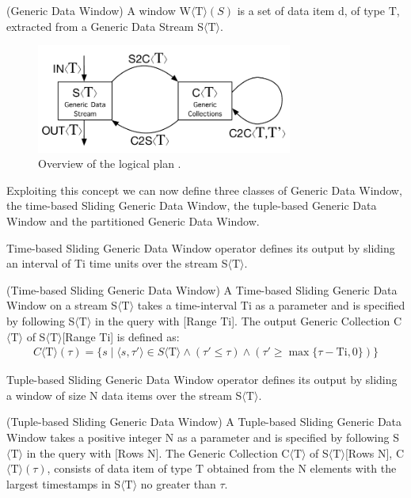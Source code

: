 {\begin{Definition}
(Generic Data Window) A window W$\langle\mathrm{T}\rangle(S)$ is a set of data item d, of type $\mathrm{T}$, extracted from a Generic Data Stream S$\langle\mathrm{T}\rangle$. 
\end{Definition}

\begin{figure}[t]
    \centering
    \includegraphics[width=0.75\textwidth]{img/computational-model-operators}
    \caption{Overview of the logical plan \textnormal{\protect\river{}}.}
    \label{fig:cm-op}
\end{figure}

Exploiting this concept we can now define three classes of Generic Data Window, the time-based Sliding Generic Data Window, the tuple-based Generic Data Window and the partitioned Generic Data Window.

Time-based Sliding Generic Data Window operator defines its output by sliding an interval of Ti time units over the stream S$\langle\mathrm{T}\rangle$.

\begin{Definition}
(Time-based Sliding Generic Data Window) A Time-based Sliding Generic Data Window on a stream S$\langle\mathrm{T}\rangle$ takes a time-interval $\mathrm{Ti}$ as a parameter and is specified by following S$\langle\mathrm{T}\rangle$ in the query with [Range $\mathrm{Ti}$].
The output Generic Collection C$\langle\mathrm{T}\rangle$ of S$\langle\mathrm{T}\rangle$[Range $\mathrm{Ti}$] is defined as:
\noindent\begin{align*}
C\langle\mathrm{T}\rangle(\tau)=\{s \mid \langle s,\tau' \rangle \in S\langle\mathrm{T}\rangle \wedge (\tau' \leq \tau) \wedge (\tau' \geq \max\{\tau - \mathrm{Ti},0\})\}
\end{align*}  
\end{Definition}

Tuple-based Sliding Generic Data Window operator defines its output by sliding a window of size N data items over the stream S$\langle\mathrm{T}\rangle$.
\begin{Definition}
(Tuple-based Sliding Generic Data Window) A Tuple-based Sliding Generic Data Window takes a positive integer N as a parameter and is specified by following S$\langle\mathrm{T}\rangle$ in the query with [Rows N].
The Generic Collection C$\langle\mathrm{T}\rangle$ of S$\langle\mathrm{T}\rangle$[Rows N], C$\langle\mathrm{T}\rangle(\tau)$, consists of data item of type $\mathrm{T}$ obtained from the N elements with the largest timestamps in S$\langle\mathrm{T}\rangle$ no greater than $\tau$.
\end{Definition}

}
